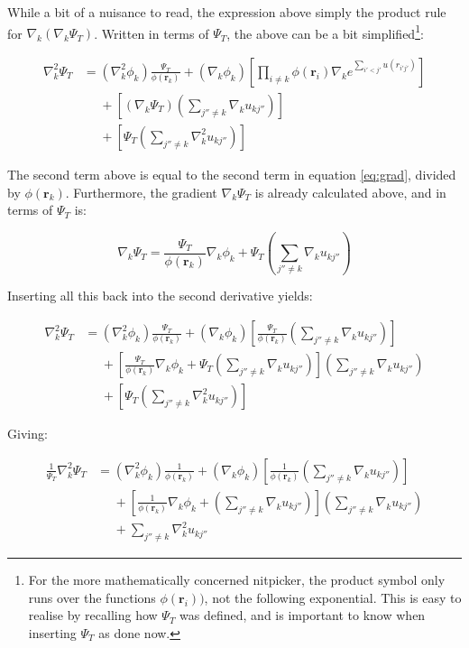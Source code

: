 \documentclass[english, a4paper]{article}
\newcommand{\bm}[1]{\mathbf{#1}}
\begin{document}
While a bit of a nuisance to read, the expression above simply the product rule for $\nabla_k(\nabla_k\Psi_T)$. Written in terms of $\Psi_T$, the above can be a bit simplified\footnote{For the more mathematically concerned nitpicker, the product symbol only runs over the functions $\phi(\bm{r}_i))$, not the following exponential. This is easy to realise by recalling how $\Psi_T$ was defined, and is important to know when inserting $\Psi_T$ as done now.}:

\begin{align*}
	\nabla_k^2\Psi_T &= (\nabla_k^2\phi_k)\frac{\Psi_T}{\phi(\bm{r}_k)} + (\nabla_k\phi_k) \left[\prod_{i\neq k}\phi(\bm{r}_i)\nabla_ke^{\sum_{i'<j'}u(r_{i'j'})}\right]\\
	&\:\:\:\:\:\: + \left[\left(\nabla_k\Psi_T\right)\left(\sum_{j''\neq k}\nabla_ku_{kj''} \right)\right]\\
	&\:\:\:\:\:\: + \left[\Psi_T\left(\sum_{j''\neq k}\nabla_k^2u_{kj''} \right)\right]
\end{align*}

The second term above is equal to the second term in equation \ref{eq:grad}, divided by $\phi(\bm{r}_k)$. Furthermore, the gradient $\nabla_k\Psi_T$ is already calculated above, and in terms of $\Psi_T$ is:

\begin{equation}
	\nabla_k\Psi_T = \frac{\Psi_T}{\phi(\bm{r}_k)}\nabla_k\phi_k + \Psi_T\left(\sum_{j''\neq k}\nabla_ku_{kj''} \right)
\end{equation}

Inserting all this back into the second derivative yields:

\begin{align*}
	\nabla_k^2\Psi_T &= (\nabla_k^2\phi_k)\frac{\Psi_T}{\phi(\bm{r}_k)} + (\nabla_k\phi_k) \left[\frac{\Psi_T}{\phi(\bm{r}_k)}\left(\sum_{j''\neq k}\nabla_ku_{kj''} \right)\right]\\
	&\:\:\:\:\:\: + \left[\frac{\Psi_T}{\phi(\bm{r}_k)}\nabla_k\phi_k + \Psi_T\left(\sum_{j''\neq k}\nabla_ku_{kj''} \right)\right]\left(\sum_{j''\neq k}\nabla_ku_{kj''} \right)\\
	&\:\:\:\:\:\: + \left[\Psi_T\left(\sum_{j''\neq k}\nabla_k^2u_{kj''} \right)\right]
\end{align*}

Giving:

\begin{align*}
	\frac{1}{\Psi_T}\nabla_k^2\Psi_T &= (\nabla_k^2\phi_k)\frac{1}{\phi(\bm{r}_k)} + (\nabla_k\phi_k) \left[\frac{1}{\phi(\bm{r}_k)}\left(\sum_{j''\neq k}\nabla_ku_{kj''} \right)\right]\\
	&\:\:\:\:\:\: + \left[\frac{1}{\phi(\bm{r}_k)}\nabla_k\phi_k + \left(\sum_{j''\neq k}\nabla_ku_{kj''} \right)\right]\left(\sum_{j''\neq k}\nabla_ku_{kj''} \right)\\
	&\:\:\:\:\:\: + \sum_{j''\neq k}\nabla_k^2u_{kj''}
\end{align*}
\end{document}
